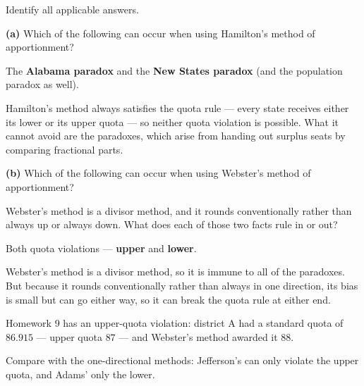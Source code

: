 \documentclass[12pt]{ximera}
\begin{document}
\begin{problem}
Identify all applicable answers.

\begin{prompt}
\textbf{(a)} Which of the following can occur when using Hamilton's method of
apportionment?

\begin{selectAll}
\end{selectAll}

\begin{feedback}
The \textbf{Alabama paradox} and the \textbf{New States paradox} (and the population
paradox as well).

Hamilton's method always satisfies the quota rule --- every state receives either its
lower or its upper quota --- so neither quota violation is possible. What it cannot avoid
are the paradoxes, which arise from handing out surplus seats by comparing fractional
parts.
\end{feedback}
\end{prompt}

\begin{prompt}
\textbf{(b)} Which of the following can occur when using Webster's method of
apportionment?

\begin{selectAll}
\end{selectAll}

\begin{hint}
Webster's method is a divisor method, and it rounds conventionally rather than always up
or always down. What does each of those two facts rule in or out?
\end{hint}

\begin{feedback}
Both quota violations --- \textbf{upper} and \textbf{lower}.

Webster's method is a divisor method, so it is immune to all of the paradoxes. But
because it rounds conventionally rather than always in one direction, its bias is small
but can go either way, so it can break the quota rule at either end.

Homework 9 has an upper-quota violation: district A had a standard quota of $86.915$ ---
upper quota $87$ --- and Webster's method awarded it $88$.

Compare with the one-directional methods: Jefferson's can only violate the upper quota,
and Adams' only the lower.
\end{feedback}
\end{prompt}
\end{problem}
\end{document}
